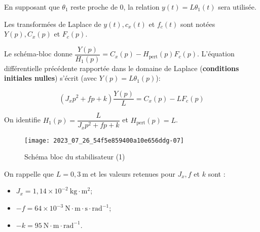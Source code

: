 En supposant que $\theta_{1}$ reste proche de 0, la relation $y(t)=L \theta_{1}(t)$ sera utilisée.

Les transformées de Laplace de $y(t), c_{x}(t)$ et $f_{c}(t)$ sont notées $Y(p), C_{x}(p)$ et $F_{c}(p)$.

\ifprof
\begin{corrige}
Le schéma-bloc donne $\dfrac{Y(p)}{H_1(p)} = C_x(p) - H_{\text{pert}}(p)F_c(p)$. L'équation différentielle précédente rapportée dans le domaine de Laplace (\textbf{conditions initiales nulles}) s'écrit (avec $Y(p) = L \theta_1(p)$):

$$ \left( J_x p^2 + f p + k \right)\dfrac{Y(p)}{L} = C_x(p) - L F_c(p) $$

On identifie $\boxed{H_1(p) = \dfrac{L}{J_x p^2 + f p + k}}$ et $\boxed{H_{\text{pert}}(p) = L}$.
\end{corrige}
\else
\fi


\begin{figure}[!h]
\centering
\texttt{[image: 2023\_07\_26\_54f5e859400a10e656ddg-07]}
\caption{\label{fig:10}Schéma bloc du stabilisateur (1)}
\end{figure}

On rappelle que $L=0,3 \mathrm{~m}$ et les valeurs retenues pour $J_{x}, f$ et $k$ sont :

\begin{itemize}
  \item $J_{x}=1,14 \times 10^{-2} \mathrm{~kg} \cdot \mathrm{m}^{2}$;

  \item $-f=64 \times 10^{-3} \mathrm{~N} \cdot \mathrm{m} \cdot \mathrm{s} \cdot \mathrm{rad}^{-1}$;

  \item $-k=95 \mathrm{~N} \cdot \mathrm{m} \cdot \mathrm{rad}^{-1}$.
\end{itemize}

